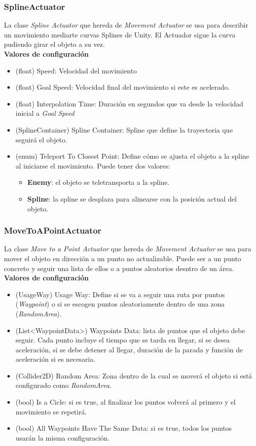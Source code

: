 \subsubsection{SplineActuator}
La clase \textit{Spline Actuator} que hereda de \textit{ Movement Actuator} se usa para describir un movimiento mediarte curvas Splines de Unity. El Actuador sigue la curva pudiendo girar el objeto a su vez.\\
\textbf{Valores de configuración}
\begin{itemize}
	\item (float) Speed: Velocidad del movimiento
	\item (float) Goal Speed: Velocidad final del movimiento si este es acelerado.
	\item (float) Interpolation Time: Duración en segundos que va desde la velocidad inicial a \textit{Goal Speed}
	\item (SplineContainer) Spline Container: Spline que define la trayectoria que seguirá el objeto.
	\item (enum) Teleport To Closest Point: Define cómo se ajusta el objeto a la spline al iniciarse el movimiento. Puede tener dos valores:
	\begin{itemize}
		\item \textbf{Enemy}: el objeto se teletransporta a la spline.
		\item \textbf{Spline}: la spline se desplaza para alinearse con la posición actual del objeto.
	\end{itemize}
\end{itemize}

\subsubsection{MoveToAPointActuator}
La clase \textit{Move to a Point Actuator} que hereda de \textit{ Movement Actuator} se usa para mover el objeto en  dirección a un punto no actualizable. Puede ser a un punto concreto y seguir una lista de ellos o a puntos aleatorios desntro de un área.\\
\textbf{Valores de configuración}
\begin{itemize} 
	\item (UsageWay) Usage Way: Define si se va a seguir una ruta por puntos (\textit{Waypoint}) o si se escogen puntos aleatoriamente dentro de una zona  (\textit{RandomArea}).
	\item (List<WaypointData>) Waypoints Data: lista de puntos que el objeto debe seguir. Cada punto incluye el tiempo que se tarda en llegar, si se desea aceleración, si se debe detener al llegar, duración de la parada y función de aceleración si es necesaria. 		
	
	 \item (Collider2D) Random Area: Zona dentro de la cual se moverá el objeto si está configurado como \textit{RandomArea}. 
	\item (bool) Is a Cicle: si es true, al finalizar los puntos volverá al primero y el movimiento se repetirá. 
	\item (bool) All Waypoints Have The Same Data: si es true, todos los puntos usarán la misma configuración. 
\end{itemize}


